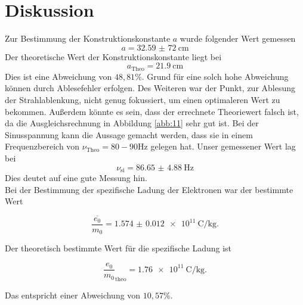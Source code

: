 \section{Diskussion}
Zur Bestimmung der Konstruktionskonstante $a$ wurde
folgender Wert gemessen
\begin{equation*}
    a = \SI{32,59(72)}{\centi\meter}
\end{equation*}
Der theoretische Wert der Konstruktionskonstante liegt bei
\begin{equation*}
   a_{\text{Theo}} = \SI{21.9}{\centi\meter}
\end{equation*}
Dies ist eine Abweichung von $48,81 \%$. Grund für eine solch hohe Abweichung
können durch Ablesefehler erfolgen. Des Weiteren war der Punkt, zur Ablesung der
Strahlablenkung, nicht genug fokussiert, um einen optimaleren Wert zu bekommen.
Außerdem könnte es sein, dass der errechnete Theoriewert falsch ist, da die Ausgleichsrechnung
in Abbildung \ref{abb:11} sehr gut ist.
Bei der Sinusspannung kann die Aussage gemacht werden, dass sie in einem Frequenzbereich
von $\nu_{\text{Theo}}=80 - 90 \si{\hertz}$ gelegen hat.
Unser gemessener Wert lag bei
\begin{equation*}
  \nu_{\text{si}}= \SI{86.65(488)}{\hertz}
\end{equation*}
Dies deutet auf eine gute Messung hin.\\
Bei der Bestimmung der spezifische Ladung der Elektronen war der bestimmte Wert

\begin{equation*}
  \overline{\frac{e_0}{m_0}} = \SI{1.574(12)e11}{\coulomb\per\kilo\gram}.
\end{equation*}

Der theoretisch bestimmte Wert für die spezifische Ladung ist

\begin{equation*}
  \frac{e_0}{m_0}_\text{theo} = \SI{1.76e11}{\coulomb\per\kilo\gram}.
\end{equation*}

Das entspricht einer Abweichung von $10,57 \%$.

